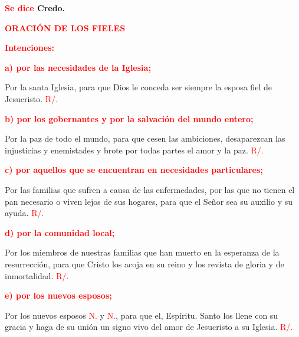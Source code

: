 \documentclass[12pt, letterpaper]{report}
\begin{document}
\Large {\bfseries \textcolor{red}{Se dice} Credo.}

\newpage

\Large {\bfseries \textcolor{red}{ORACI\'ON DE LOS FIELES}} \newline

\large {\bfseries \textcolor{red}{Intenciones:}} \newline

\large {\bfseries \textcolor{red}{a) por las necesidades de la Iglesia;}} \newline

\Large Por la santa Iglesia, para que Dios le conceda ser siempre la esposa fiel de Jesucristo. \hspace{1cm} \textcolor{red}{R/.}\newline

\large {\bfseries \textcolor{red}{b) por los gobernantes y por la salvaci\'on del mundo entero;}} \newline

\Large Por la paz de todo el mundo, para que cesen las ambiciones, desaparezcan las injusticias y enemistades y brote por todas partes el amor y la paz. \hspace{1cm} \textcolor{red}{R/.}\newline

\large {\bfseries \textcolor{red}{c) por aquellos que se encuentran en necesidades particulares;}} \newline

\Large Por las familias que sufren a causa de las enfermedades, por las que no tienen el pan necesario o viven lejos de sus hogares, para que el Se\~nor sea su auxilio y su ayuda. \hspace{1cm} \textcolor{red}{R/.}\newline

\large {\bfseries \textcolor{red}{d) por la comunidad local;}} \newline

\Large Por los miembros de nuestras familias que han muerto en la esperanza de la resurrecci\'on, para que Cristo los acoja en su reino y los revista de gloria y de inmortalidad. \hspace{1cm} \textcolor{red}{R/.}\newline

\large {\bfseries \textcolor{red}{e) por los nuevos esposos;}} \newline

\Large Por los nuevos esposos \textcolor{red}{N.} y \textcolor{red}{N.}, para que el, Esp\'iritu. Santo los llene con su gracia y haga de su uni\'on un signo vivo del amor de Jesucristo a su Iglesia. \hspace{1cm} \textcolor{red}{R/.} \newline
\end{document}
